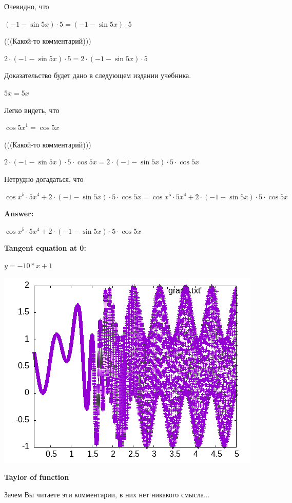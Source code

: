 \documentclass[12pt,a4paper,fleqn]{article}
\theoremstyle{definition}
\begin{document}
Очевидно, что 

$( -1  - \sin 5  x ) \cdot  5  = ( -1  - \sin 5  x ) \cdot  5 $

(((Какой-то комментарий))) 

$ 2  \cdot ( -1  - \sin 5  x ) \cdot  5  =  2  \cdot ( -1  - \sin 5  x ) \cdot  5 $

Доказательство будет дано в следующем издании учебника. 

$ 5  x  =  5  x $

Легко видеть, что 

${\cos 5  x }^{ 1 } = \cos 5  x $

(((Какой-то комментарий))) 

$ 2  \cdot ( -1  - \sin 5  x ) \cdot  5  \cdot \cos 5  x  =  2  \cdot ( -1  - \sin 5  x ) \cdot  5  \cdot \cos 5  x $

Нетрудно догадаться, что 

$\cos{ x }^{ 5 } \cdot  5 { x }^{ 4 } +  2  \cdot ( -1  - \sin 5  x ) \cdot  5  \cdot \cos 5  x  = \cos{ x }^{ 5 } \cdot  5 { x }^{ 4 } +  2  \cdot ( -1  - \sin 5  x ) \cdot  5  \cdot \cos 5  x $


\textbf{Answer:}

$\cos{ x }^{ 5 } \cdot  5 { x }^{ 4 } +  2  \cdot ( -1  - \sin 5  x ) \cdot  5  \cdot \cos 5  x $


\textbf{Tangent equation at 0:}

$y = -10 * x + 1$


\includegraphics{./graph.png} 



\textbf{Taylor of function}


Зачем Вы читаете эти комментарии, в них нет никакого смысла... 
\end{document}
